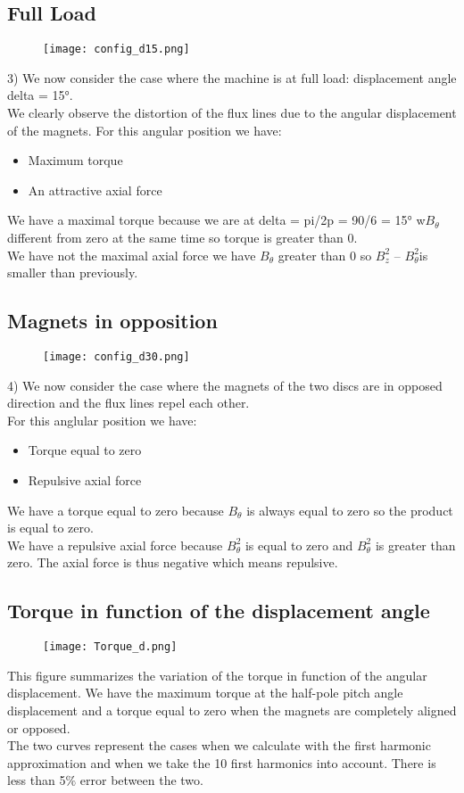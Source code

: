 \subsection*{Full Load}
\begin{figure}[H]
    \centering
    \texttt{[image: config\_d15.png]}
\end{figure}
3)	We now consider the case where the machine is at full load: displacement angle delta = 15°.\\
We clearly observe the distortion of the flux lines due to the angular displacement of the magnets. For this angular position we have:
\begin{itemize}
    \item Maximum torque
    \item An attractive axial force
\end{itemize}
We have a maximal torque because we are at delta = pi/2p = 90/6 = 15° w$B_{\theta}$ different from zero at the same time so torque is greater than 0.\\
We have not the maximal axial force we have $B_{\theta}$ greater than 0 so $B_{z}^2$ – $B_{\theta}^2$is smaller than previously.

\subsection*{Magnets in opposition}
\begin{figure}[H]
    \centering
    \texttt{[image: config\_d30.png]}
\end{figure}
4)	We now consider the case where the magnets of the two discs are in opposed direction and the flux lines repel each other.\\
For this anglular position we have:
\begin{itemize}
    \item Torque equal to zero
    \item Repulsive axial force
\end{itemize}
We have a torque equal to zero because $B_{\theta}$ is always equal to zero so the product is equal to zero.\\
We have a repulsive axial force because $B_{\theta}^2$ is equal to zero and $B_{\theta}^2$ is greater than zero. The axial force is thus negative which means repulsive.

\subsection*{Torque in function of the displacement angle}
\begin{figure}[H]
    \centering
    \texttt{[image: Torque\_d.png]}
\end{figure}
This figure summarizes the variation of the torque in function of the angular displacement. We have the maximum torque at the half-pole pitch angle displacement and a torque equal to zero when the magnets are completely aligned or opposed.\\
The two curves represent the cases when we calculate with the first harmonic approximation and when we take the 10 first harmonics into account. There is less than 5$\%$ error between the two.

